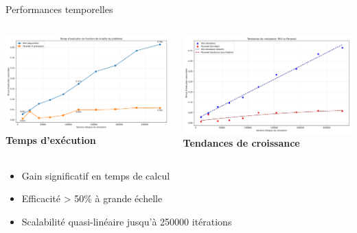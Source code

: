 \begin{frame}{Performances temporelles}
    \begin{columns}
        \includegraphics[width=\textwidth]{../Document/figures/benchmarks/execution_time_steps}
        \textbf{Temps d'exécution}
        
        \includegraphics[width=\textwidth]{../Document/figures/benchmarks/growth_trends}
        \textbf{Tendances de croissance}
    \end{columns}
    \vspace{0.3cm}
    \begin{itemize}
        \item Gain significatif en temps de calcul
        \item Efficacité > 50\% à grande échelle
        \item Scalabilité quasi-linéaire jusqu'à 250000 itérations
    \end{itemize}
\end{frame}

